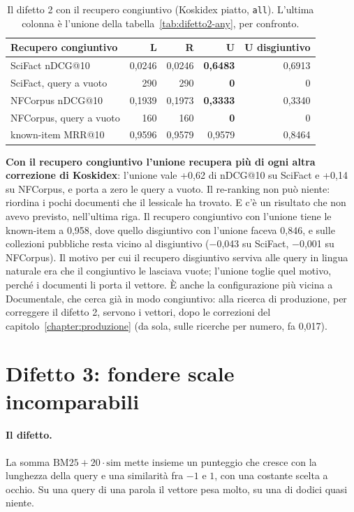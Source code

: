 \begin{table}[ht]
  \centering
  \begin{tabular}{lrrrr}
    \toprule
    Recupero congiuntivo & L & R & U & U disgiuntivo \\
    \midrule
    SciFact nDCG@10 & 0,0246 & 0,0246 & \textbf{0,6483} & 0,6913 \\
    SciFact, query a vuoto & 290 & 290 & \textbf{0} & 0 \\
    NFCorpus nDCG@10 & 0,1939 & 0,1973 & \textbf{0,3333} & 0,3340 \\
    NFCorpus, query a vuoto & 160 & 160 & \textbf{0} & 0 \\
    known-item MRR@10 & 0,9596 & 0,9579 & 0,9579 & 0,8464 \\
    \bottomrule
  \end{tabular}
  \caption{Il difetto 2 con il recupero congiuntivo (Koskidex piatto, \texttt{all}). L'ultima colonna
  è l'unione della tabella~\ref{tab:difetto2-any}, per confronto.}
  \label{tab:difetto2-all}
\end{table}

\textbf{Con il recupero congiuntivo l'unione recupera più di ogni altra
correzione di Koskidex}: l'unione vale +0,62 di nDCG@10 su SciFact e +0,14 su NFCorpus, e porta a
zero le query a vuoto. Il re-ranking non può niente: riordina i pochi documenti che
il lessicale ha trovato. E c'è un risultato che non avevo previsto, nell'ultima
riga. Il recupero congiuntivo con l'unione tiene le known-item a 0,958, dove quello
disgiuntivo con l'unione faceva 0,846, e sulle collezioni pubbliche resta vicino al
disgiuntivo ($-$0,043 su SciFact, $-$0,001 su NFCorpus). Il motivo per cui il recupero
disgiuntivo serviva alle query in lingua naturale era che il congiuntivo le
lasciava vuote; l'unione toglie quel motivo, perché i documenti li porta il
vettore. È anche la configurazione più vicina a Documentale, che cerca già in modo
congiuntivo: alla ricerca di produzione, per correggere il difetto 2, servono i
vettori, dopo le correzioni del capitolo~\ref{chapter:produzione} (da sola, sulle
ricerche per numero, fa 0,017).

\section{Difetto 3: fondere scale incomparabili}\label{sec:difetto3}

\paragraph{Il difetto.} La somma $\text{BM25} + 20 \cdot \text{sim}$ mette insieme un
punteggio che cresce con la lunghezza della query e una similarità fra $-1$ e $1$,
con una costante scelta a occhio. Su una query di una parola il vettore pesa molto,
su una di dodici quasi niente.

